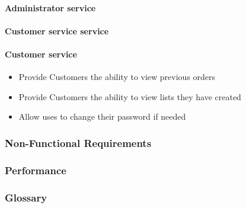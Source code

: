 	\paragraph{Administrator service}
	\paragraph{Customer service service}
	\paragraph{Customer service}
		\begin{itemize}
			\item Provide Customers the ability to view previous orders
			\item Provide Customers the ability to view lists they have created
			\item Allow uses to change their password if needed
		\end{itemize}
\subsubsection{Non-Functional Requirements}
\subsubsection{Performance}
\subsubsection{Glossary}
